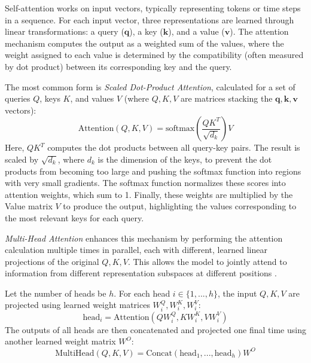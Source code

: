 Self-attention works on input vectors, typically representing tokens or time steps in a sequence. For each input vector, three representations are learned through linear transformations: a query (\( \bm{q} \)), a key (\( \bm{k} \)), and a value (\( \bm{v} \)). The attention mechanism computes the output as a weighted sum of the values, where the weight assigned to each value is determined by the compatibility (often measured by dot product) between its corresponding key and the query.

The most common form is \textit{Scaled Dot-Product Attention}, calculated for a set of queries \( Q \), keys \( K \), and values \( V \) (where \( Q, K, V \) are matrices stacking the \( \bm{q}, \bm{k}, \bm{v} \) vectors):
\begin{equation}
    \text{Attention}(Q, K, V) = \text{softmax}\left(\frac{QK^T}{\sqrt{d_k}}\right) V
    \label{eq:scaled_dot_product_attention}
\end{equation}
Here, \( QK^T \) computes the dot products between all query-key pairs. The result is scaled by \( \sqrt{d_k} \), where \( d_k \) is the dimension of the keys, to prevent the dot products from becoming too large and pushing the softmax function into regions with very small gradients. The softmax function normalizes these scores into attention weights, which sum to 1. Finally, these weights are multiplied by the Value matrix \( V \) to produce the output, highlighting the values corresponding to the most relevant keys for each query.

\textit{Multi-Head Attention} enhances this mechanism by performing the attention calculation multiple times in parallel, each with different, learned linear projections of the original \( Q, K, V \). This allows the model to jointly attend to information from different representation subspaces at different positions \autocite{vaswani2017attention}.

Let the number of heads be \( h \). For each head \( i \in \{1, ..., h\} \), the input \( Q, K, V \) are projected using learned weight matrices \( W^Q_i, W^K_i, W^V_i \):
\begin{equation}
    \text{head}_i = \text{Attention}(Q W^Q_i, K W^K_i, V W^V_i)
    \label{eq:attention_head_i}
\end{equation}
The outputs of all heads are then concatenated and projected one final time using another learned weight matrix \( W^O \):
\begin{equation}
    \text{MultiHead}(Q, K, V) = \text{Concat}(\text{head}_1, ..., \text{head}_h) W^O
    \label{eq:multihead_attention}
\end{equation}

